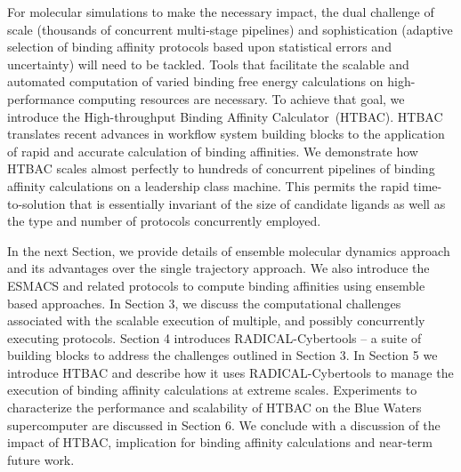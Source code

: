 \documentclass[conference]{IEEEtran}
\begin{document}
For molecular simulations to make the necessary impact, the dual challenge of
scale (thousands of concurrent multi-stage pipelines) and sophistication
(adaptive selection of binding affinity protocols based upon statistical
errors and uncertainty) will need to be tackled. Tools that facilitate the
scalable and automated computation of varied binding free energy calculations
on high-performance computing resources are necessary. To achieve that goal,
we introduce the High-throughput Binding Affinity Calculator~(HTBAC). HTBAC
translates recent advances in workflow system building blocks to the
application of rapid and accurate calculation of  binding affinities. We
demonstrate how HTBAC scales almost perfectly to hundreds of concurrent
pipelines of binding affinity calculations on a leadership class machine. This
permits the rapid time-to-solution that is essentially invariant of the size
of candidate ligands as well as the type and number of protocols concurrently
employed.

In the next Section, we provide details of ensemble molecular dynamics
approach and its advantages over the single trajectory
approach. We also introduce the ESMACS and related protocols to compute
binding affinities using ensemble based approaches. In Section 3, we discuss
the computational challenges associated with the scalable execution of
multiple, and possibly concurrently executing protocols. Section 4 introduces
RADICAL-Cybertools -- a suite of building blocks to address the challenges
outlined in Section 3. In Section 5 we introduce HTBAC and describe how it
uses RADICAL-Cybertools to manage the execution of binding affinity calculations
at extreme scales. Experiments to characterize the performance and scalability
of HTBAC on the Blue Waters supercomputer are discussed in Section 6. We
conclude with a discussion of the impact of HTBAC, implication for binding
affinity calculations and near-term future work.

%
%
%

%
%

%
%
%
%
%
%
%
%
%
%
%
%
%
%
%
%
%
%
%
%

%
%
%
%
%
%
%
%

%

%
%
%
%
%
%

%
%
%
%
%
%
%
%
%
%
%
%
%
%
 

%
%
%
\end{document}
